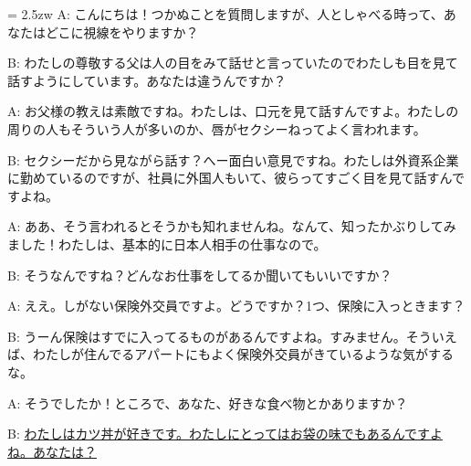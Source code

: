 \documentclass[11pt]{amsart}
\title{}
\author{}
\newenvironment{hangall}[1]{\hangindent = 2.5zw\everypar{\hangindent = 2.5zw}}{}
\begin{document}
\maketitle
\begin{hangall}{}%
A: こんにちは！つかぬことを質問しますが、人としゃべる時って、あなたはどこに視線をやりますか？

B: わたしの尊敬する父は人の目をみて話せと言っていたのでわたしも目を見て話すようにしています。あなたは違うんですか？

A: お父様の教えは素敵ですね。わたしは、口元を見て話すんですよ。わたしの周りの人もそういう人が多いのか、唇がセクシーねってよく言われます。

B: セクシーだから見ながら話す？へー面白い意見ですね。わたしは外資系企業に勤めているのですが、社員に外国人もいて、彼らってすごく目を見て話すんですよね。

A: ああ、そう言われるとそうかも知れませんね。なんて、知ったかぶりしてみました！わたしは、基本的に日本人相手の仕事なので。

B: そうなんですね？どんなお仕事をしてるか聞いてもいいですか？

A: ええ。しがない保険外交員ですよ。どうですか？1つ、保険に入っときます？

B: うーん保険はすでに入ってるものがあるんですよね。すみません。そういえば、わたしが住んでるアパートにもよく保険外交員がきているような気がするな。

A: そうでしたか！ところで、あなた、好きな食べ物とかありますか？

B: \ul{わたしはカツ丼が好きです。わたしにとってはお袋の味でもあるんですよね。あなたは？}\end{hangall}
\end{document}
